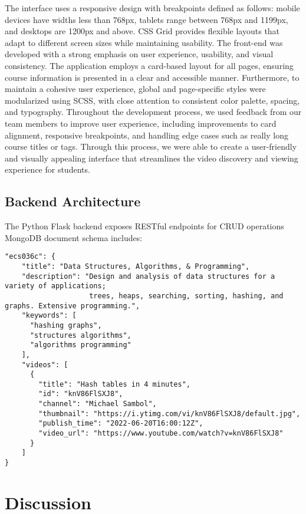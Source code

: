 \documentclass[manuscript,nonacm]{acmart}
\begin{document}
The interface uses a responsive design with breakpoints defined as follows: mobile devices have widths less than 768px, tablets range between 768px and 1199px, and desktops are 1200px and above. CSS Grid provides flexible layouts that adapt to different screen sizes while maintaining usability.
The front-end was developed with a strong emphasis on user experience, usability, and visual consistency. The application employs a card-based layout for all pages, ensuring course information is presented in a clear and accessible manner. 
Furthermore, to maintain a cohesive user experience, global and page-specific styles were modularized using SCSS, with close attention to consistent color palette, spacing, and typography.
Throughout the development process, we used feedback from our team members to improve user experience, including improvements to card alignment, responsive breakpoints, and handling edge cases such as really long course titles or tags.
Through this process, we were able to create a user-friendly and visually appealing interface that streamlines the video discovery and viewing experience for students.

\subsection{Backend Architecture}

The Python Flask backend exposes RESTful endpoints for CRUD operations\\
\newline
MongoDB document schema includes:
\begin{verbatim}
"ecs036c": {
    "title": "Data Structures, Algorithms, & Programming",
    "description": "Design and analysis of data structures for a variety of applications;
                    trees, heaps, searching, sorting, hashing, and graphs. Extensive programming.",
    "keywords": [
      "hashing graphs",
      "structures algorithms",
      "algorithms programming"
    ],
    "videos": [
      {
        "title": "Hash tables in 4 minutes",
        "id": "knV86FlSXJ8",
        "channel": "Michael Sambol",
        "thumbnail": "https://i.ytimg.com/vi/knV86FlSXJ8/default.jpg",
        "publish_time": "2022-06-20T16:00:12Z",
        "video_url": "https://www.youtube.com/watch?v=knV86FlSXJ8"
      }
    ]
}
\end{verbatim}

\section{Discussion}
\end{document}
